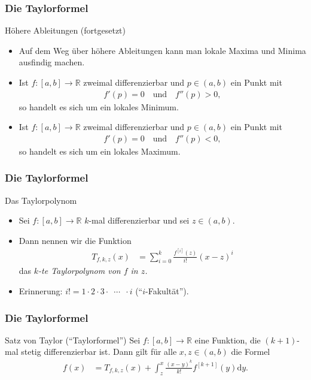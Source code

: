 \documentclass{beamer}
\renewcommand{\emph}[1]{{\textcolor{solarizedRed}{\itshape #1}}}
\newcommand\dd{\mathrm d}
\newcommand\RR{\mathbb R}
\renewcommand{\ae}{\"a}
\renewcommand{\oe}{\"o}
\newcommand{\ue}{\"u}
\newcommand{\mytitle}{Die Taylorformel}
\begin{document}
\begin{frame}\frametitle{\mytitle}
	\begin{block}{H\oe here Ableitungen (fortgesetzt)}
		\begin{itemize}
			\item Auf dem Weg \ue ber h\oe here Ableitungen kann man lokale Maxima und Minima ausfindig machen.
			\item Ist $f:[a,b]\to\RR$ zweimal differenzierbar und $p\in(a,b)$ ein Punkt mit
				\begin{align*}
					f'(p)=0\quad\mbox{und}\quad f''(p)>0,
				\end{align*}
				so handelt es sich um ein lokales Minimum.
			\item Ist $f:[a,b]\to\RR$ zweimal differenzierbar und $p\in(a,b)$ ein Punkt mit
				\begin{align*}
					f'(p)=0\quad\mbox{und}\quad f''(p)<0,
				\end{align*}
				so handelt es sich um ein lokales Maximum.
		\end{itemize}
	\end{block}
\end{frame}

\begin{frame}\frametitle{\mytitle}
	\begin{block}{Das Taylorpolynom}
		\begin{itemize}
			\item Sei $f:[a,b]\to\RR$ $k$-mal differenzierbar und sei $z\in(a,b)$.
			\item Dann nennen wir die Funktion
				\begin{align*}
					T_{f,k,z}(x)&=\sum_{i=0}^k\frac{f^{[i]}(z)}{i!}(x-z)^i
				\end{align*}
				das \emph{$k$-te Taylorpolynom von $f$ in $z$.}
			\item \alert{Erinnerung:} $i!=1\cdot2\cdot3\cdot\enspace\cdots\enspace\cdot i$ \hfill(``$i$-Fakult\ae t'').
		\end{itemize}
	\end{block}
\end{frame}

\begin{frame}\frametitle{\mytitle}
	\begin{block}{Satz von Taylor (``Taylorformel'')}
		Sei $f:[a,b]\to\RR$ eine Funktion, die $(k+1)$-mal stetig differenzierbar ist.
		Dann gilt f\ue r alle $x,z\in(a,b)$ die Formel
		\begin{align*}
			f(x)&=T_{f,k,z}(x)+\int_z^x\frac{(x-y)^k}{k!}f^{[k+1]}(y)\dd y.
		\end{align*}
	\end{block}
\end{frame}
\end{document}
